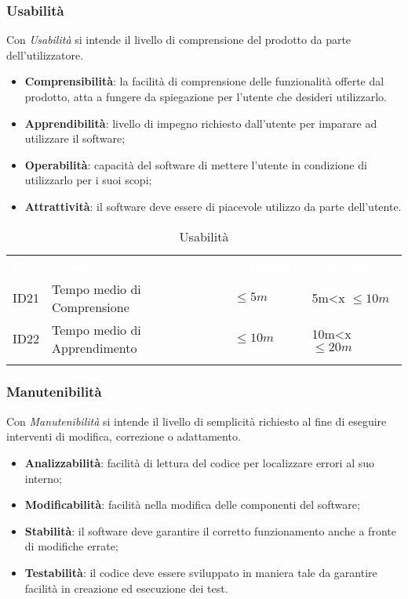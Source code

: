 \fi


\subsubsection{Usabilità}

Con \textit{Usabilità} si intende il livello di comprensione del prodotto da parte dell'utilizzatore.

\begin{itemize}
	\item \textbf{Comprensibilità}: la facilità di comprensione delle funzionalità offerte dal prodotto, atta a fungere da spiegazione per l'utente che desideri utilizzarlo. 
	\item \textbf{Apprendibilità}: livello di impegno richiesto dall'utente per imparare ad utilizzare il software;
	\item \textbf{Operabilità}: capacità del software di mettere l'utente in condizione di utilizzarlo per i suoi scopi; 
	\item \textbf{Attrattività}: il software deve essere di piacevole utilizzo da parte dell'utente.
\end{itemize}

\begin{longtable}{|C{.15\textwidth}|C{.24\textwidth}|C{.24\textwidth}|C{.24\textwidth}|}
\hline
{}\textbf{\textcolor{white}{ID}} & \textbf{\textcolor{white}{Nome}} & \textbf{\textcolor{white}{Ottimalità}} & \textbf{\textcolor{white}{Accettabilità}}\\
ID21 & Tempo medio di Comprensione & $\leq 5m$ & 5m<x $\leq 10m$\\
\hline
{}ID22 & Tempo medio di Apprendimento & $\leq 10m$ & 10m<x $\leq 20m$ \\ 
\hline
\caption{Usabilità}
\label{Usabilità}
\end{longtable}

\subsubsection{Manutenibilità}

Con \textit{Manutenibilità} si intende il livello di semplicità richiesto al fine di eseguire interventi di modifica, correzione o adattamento.

\begin{itemize}
	\item \textbf{Analizzabilità}: facilità di lettura del codice per localizzare errori al suo interno; 
	\item \textbf{Modificabilità}: facilità nella modifica delle componenti del software;
	\item \textbf{Stabilità}: il software deve garantire il corretto funzionamento anche a fronte di modifiche errate;
	\item \textbf{Testabilità}: il codice deve essere sviluppato in maniera tale da garantire facilità in creazione ed esecuzione dei test.
\end{itemize}

